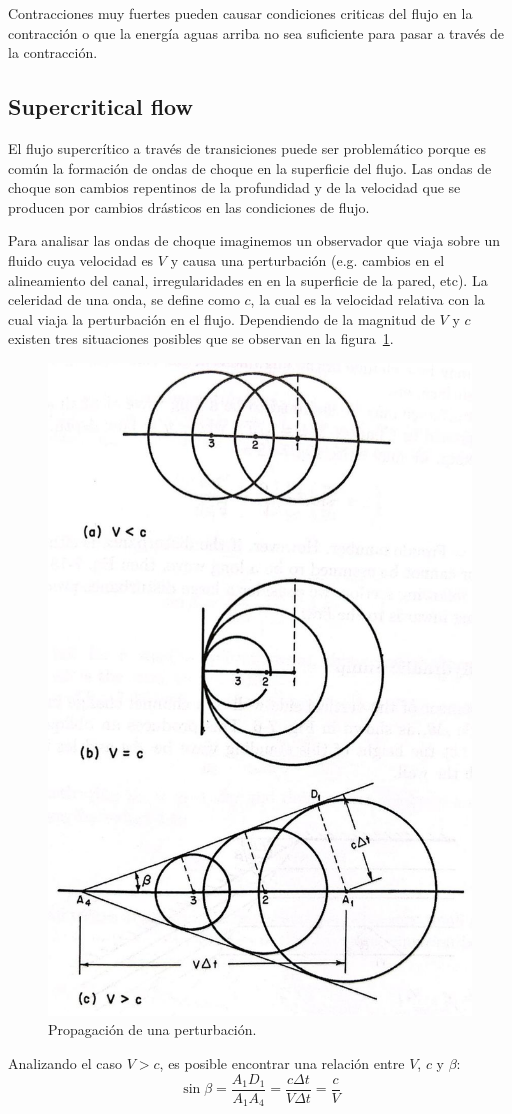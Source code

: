 \documentclass[11pt, oneside]{article}
\begin{document}
Contracciones muy fuertes pueden causar condiciones criticas del flujo en la contracci\'on o que la energ\'ia aguas arriba no sea suficiente para pasar a trav\'es de la contracci\'on. 

\subsection{Supercritical flow}
El flujo supercr\'itico a trav\'es de transiciones puede ser problem\'atico porque es com\'un la formaci\'on de ondas de choque en la superficie del flujo. Las ondas de choque son cambios repentinos de la profundidad y de la velocidad que se producen por cambios dr\'asticos en las condiciones de flujo. 

Para analisar las ondas de choque imaginemos un observador que viaja sobre un fluido cuya velocidad es $V$  y causa una perturbaci\'on (e.g. cambios en el alineamiento del canal, irregularidades en en la superficie de la pared, etc). La celeridad de una onda, se define como $c$, la cual es la velocidad relativa con la cual viaja la perturbaci\'on en el flujo. Dependiendo de la magnitud de $V$ y $c$ existen tres situaciones posibles  que se observan en la figura~\ref{fig75}.
\begin{figure}[h]
    \centering
    \includegraphics[width=0.8\linewidth]{fig75.jpeg}
    \caption{Propagaci\'on de una perturbaci\'on.}
    \label{fig75}
\end{figure}
Analizando el caso $V>c$, es posible encontrar una relaci\'on entre $V$, $c$ y $\beta$:
\begin{equation}
    \sin \beta = \frac{A_1 D_1}{A_1 A_4} = \frac{c \Delta t}{V \Delta t} = \frac{c}{V}
    \label{eq6}
\end{equation}
\end{document}

